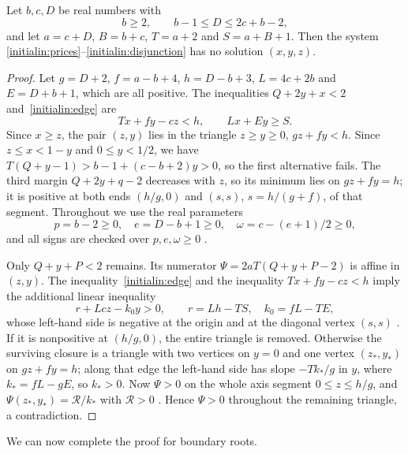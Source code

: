\begin{lemma}
\label{initialin:scalar}
Let $b,c,D$ be real numbers with
\begin{equation}\label{initialin:range}
 b\ge2,\qquad b-1\le D\le2c+b-2,
\end{equation}
and let $a=c+D$, $B=b+c$, $T=a+2$ and $S=a+B+1$. Then the system
\eqref{initialin:prices}--\eqref{initialin:disjunction} has no solution $(x,y,z)$.
\end{lemma}
\begin{proof}
Let $g=D+2$, $f=a-b+4$, $h=D-b+3$, $L=4c+2b$ and
$E=D+b+1$, which are all positive. The inequalities $Q+2y+x<2$ and~\eqref{initialin:edge} are
\[
 Tx+fy-cz<h,\qquad Lx+Ey\ge S.
\]
Since $x\ge z$, the pair $(z,y)$ lies in the triangle
$z\ge y\ge0$, $gz+fy<h$.
Since $z\le x<1-y$ and $0\le y<1/2$, we have
$T(Q+y-1)>b-1+(c-b+2)y>0$, so the first alternative fails.
The third margin $Q+2y+q-2$ decreases with $z$, so its minimum lies on
$gz+fy=h$; it is positive at both ends $(h/g,0)$ and $(s,s)$,
$s=h/(g+f)$, of that segment. Throughout we use the real parameters
\[
 p=b-2\ge0,\quad e=D-b+1\ge0,\quad
 \omega=c-(e+1)/2\ge0,
\]
and all signs are checked over $p,e,\omega\ge0$ .

Only $Q+y+P<2$ remains. Its numerator $\Psi=2aT(Q+y+P-2)$ is affine in
$(z,y)$. The inequality~\eqref{initialin:edge} and the inequality $Tx+fy-cz<h$ imply the additional
linear inequality
\[
 r+Lcz-k_0y>0,\qquad r=Lh-TS,\quad k_0=fL-TE,
\]
whose left-hand side is negative at the origin and at the diagonal
vertex $(s,s)$ . If it is nonpositive at $(h/g,0)$, the entire
triangle is removed. Otherwise the surviving closure is a triangle
with two vertices on $y=0$ and one vertex $(z_*,y_*)$ on $gz+fy=h$; along
that edge the left-hand side has slope $-Tk_*/g$ in $y$, where
$k_*=fL-gE$, so $k_*>0$.
Now $\Psi>0$ on the whole axis segment $0\le z\le h/g$, and
$\Psi(z_*,y_*)=\mathcal R/k_*$ with $\mathcal R>0$ .
Hence $\Psi>0$ throughout the remaining triangle, a contradiction.
\end{proof}

We can now complete the proof for boundary roots.

